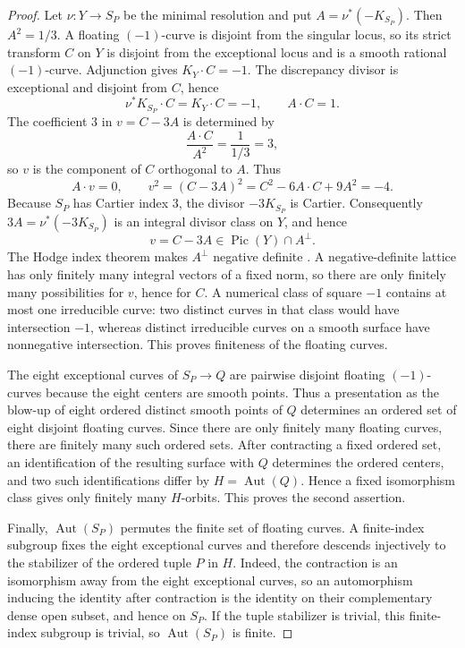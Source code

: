 \documentclass[11pt]{article}
\theoremstyle{plain}
\theoremstyle{definition}
\theoremstyle{remark}
\begin{document}
\begin{proof}
Let \(\nu:Y\to S_P\) be the minimal resolution and put
\(A=\nu^*(-K_{S_P})\). Then \(A^2=1/3\). A floating
\((-1)\)-curve is disjoint from the singular locus, so its strict transform
\(C\) on \(Y\) is disjoint from the exceptional locus and is a smooth
rational \((-1)\)-curve. Adjunction gives \(K_Y\cdot C=-1\). The discrepancy
divisor is exceptional and disjoint from \(C\), hence
\[
\nu^*K_{S_P}\cdot C=K_Y\cdot C=-1,
\qquad A\cdot C=1.
\]
The coefficient \(3\) in \(v=C-3A\) is determined by
\[
\frac{A\cdot C}{A^2}=\frac{1}{1/3}=3,
\]
so \(v\) is the component of \(C\) orthogonal to \(A\). Thus
\[
A\cdot v=0,\qquad
v^2=(C-3A)^2=C^2-6A\cdot C+9A^2=-4.
\]
Because \(S_P\) has Cartier index \(3\), the divisor \(-3K_{S_P}\) is
Cartier. Consequently \(3A=\nu^*(-3K_{S_P})\) is an integral divisor class
on \(Y\), and hence
\[
v=C-3A\in\operatorname{Pic}(Y)\cap A^\perp.
\]
The Hodge index theorem makes \(A^\perp\) negative definite
\cite[Chapter~V, Theorem~1.9]{Hartshorne1977}. A negative-definite lattice
has only finitely many integral vectors of a fixed norm, so there are only
finitely many possibilities for \(v\), hence for \(C\). A numerical class
of square \(-1\) contains at most one irreducible curve: two distinct curves
in that class would have intersection \(-1\), whereas distinct irreducible
curves on a smooth surface have nonnegative intersection. This proves
finiteness of the floating curves.

The eight exceptional curves of \(S_P\to Q\) are pairwise disjoint floating
\((-1)\)-curves because the eight centers are smooth points. Thus a
presentation as the blow-up of eight ordered distinct smooth points of
\(Q\) determines an ordered set of eight disjoint floating curves. Since
there are only finitely many floating curves, there are finitely many such
ordered sets. After contracting a fixed ordered set, an identification of
the resulting surface with \(Q\) determines the ordered centers, and two
such identifications differ by \(H=\operatorname{Aut}(Q)\). Hence a fixed
isomorphism class gives only finitely many \(H\)-orbits. This proves the
second assertion.

Finally, \(\operatorname{Aut}(S_P)\) permutes the finite set of floating
curves. A finite-index subgroup fixes the eight exceptional curves and
therefore descends injectively to the stabilizer of the ordered tuple \(P\)
in \(H\). Indeed, the contraction is an isomorphism away from the eight
exceptional curves, so an automorphism inducing the identity after contraction
is the identity on their complementary dense open subset, and hence on
\(S_P\). If the tuple stabilizer is trivial, this finite-index subgroup is
trivial, so \(\operatorname{Aut}(S_P)\) is finite.
\end{proof}
\end{document}
